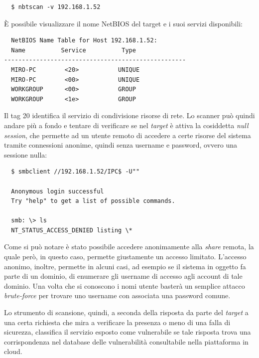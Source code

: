 \documentclass[target=bach,aauheader=]{thud}
\begin{document}
\begin{verbatim}
  $ nbtscan -v 192.168.1.52
\end{verbatim}

È possibile visualizzare il nome NetBIOS del target e i suoi servizi disponibili:

\begin{verbatim}
  NetBIOS Name Table for Host 192.168.1.52:
  Name          Service          Type
---------------------------------------------------
  MIRO-PC        <20>           UNIQUE
  MIRO-PC        <00>           UNIQUE
  WORKGROUP      <00>           GROUP
  WORKGROUP      <1e>           GROUP
\end{verbatim}

Il tag 20 identifica il servizio di condivisione risorse di rete. Lo scanner può quindi andare più a fondo e tentare di verificare se nel \textit{target} è attiva la cosiddetta \textit{null session}, che permette ad un utente remoto di accedere a certe risorse del sistema tramite connessioni anonime, quindi senza username e password, ovvero una sessione nulla:

\begin{verbatim}
  $ smbclient //192.168.1.52/IPC$ -U""

  Anonymous login successful
  Try "help" to get a list of possible commands.
  
  smb: \> ls
  NT_STATUS_ACCESS_DENIED listing \*
\end{verbatim}

Come si può notare è stato possibile accedere anonimamente alla \textit{share} remota, la quale però, in questo caso, permette giustamente un accesso limitato. L’accesso anonimo, inoltre, permette in alcuni casi, ad esempio se il sistema in oggetto fa parte di un dominio, di enumerare gli username di accesso agli account di tale dominio. Una volta che si conoscono i nomi utente basterà un semplice attacco \textit{brute-force} per trovare uno username con associata una password comune.

Lo strumento di scansione, quindi, a seconda della risposta da parte del \textit{target} a una certa richiesta che mira a verificare la presenza o meno di una falla di sicurezza, classifica il servizio esposto come vulnerabile se tale risposta trova una corrispondenza nel database delle vulnerabilità consultabile nella piattaforma in cloud.
\end{document}
